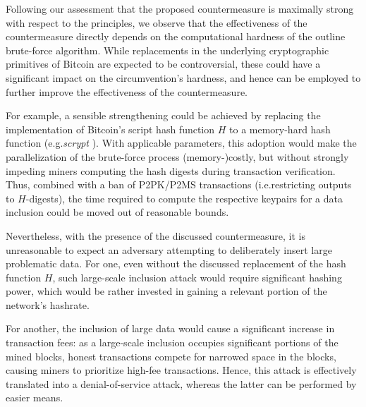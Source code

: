 \documentclass[a4paper,11pt,titlepage]{scrbook}
\begin{document}
Following our assessment that the proposed countermeasure is maximally strong with respect to the principles, we observe that the effectiveness of the countermeasure directly depends on the computational hardness of the outline brute-force algorithm.
While replacements in the underlying cryptographic primitives of Bitcoin are expected to be controversial, these could have a significant impact on the circumvention's hardness, and hence can be employed to further improve the effectiveness of the countermeasure.

For example, a sensible strengthening could be achieved by replacing the implementation of Bitcoin's script hash function $H$ to a memory-hard hash function (e.g.\@ \emph{scrypt} \cite{percival_scrypt}).
With applicable parameters, this adoption would make the parallelization of the brute-force process (memory-)costly, but without strongly impeding miners computing the hash digests during transaction verification.
Thus, combined with a ban of P2PK/P2MS transactions (i.e.\@ restricting outputs to $H$-digests), the time required to compute the respective keypairs for a data inclusion could be moved out of reasonable bounds.


Nevertheless, with the presence of the discussed countermeasure, it is unreasonable to expect an adversary attempting to deliberately insert large problematic data.
For one, even without the discussed replacement of the hash function $H$, such large-scale inclusion attack would require significant hashing power, which would be rather invested in gaining a relevant portion of the network's hashrate.

For another, the inclusion of large data would cause a significant increase in transaction fees:
as a large-scale inclusion occupies significant portions of the mined blocks, honest transactions compete for narrowed space in the blocks, causing miners to prioritize high-fee transactions.
Hence, this attack is effectively translated into a denial-of-service attack, whereas the latter can be performed by easier means.


\backmatter

 \label{listoffig}
\listoffigures
\cleardoublepage
{} \label{listoftab}
\listoftables

\cleardoublepage
{} \label{biblio}
\printbibliography[title=References]
\end{document}
